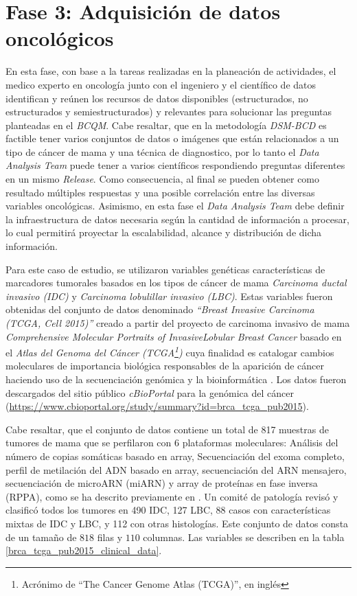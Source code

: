 \section{Fase 3: Adquisición de datos oncológicos}
En esta fase, con base a la tareas realizadas en la planeación de actividades, el medico experto en oncología junto con el ingeniero y el científico de datos identifican y reúnen los recursos de datos disponibles (estructurados, no estructurados y semiestructurados) y relevantes para solucionar las preguntas planteadas en el \textit{BCQM}. Cabe resaltar, que en la metodología \textit{\textit{DSM-BCD}} es factible tener varios conjuntos de datos o imágenes que están relacionados a un tipo de cáncer de mama y una técnica de diagnostico, por lo tanto  el \textit{Data Analysis Team} puede tener a varios científicos respondiendo preguntas diferentes en un mismo \textit{Release}. Como consecuencia, al final se pueden obtener como resultado múltiples respuestas y una posible correlación entre las diversas variables oncológicas.  Asimismo, en esta fase el \textit{Data Analysis Team} debe definir la infraestructura de datos necesaria según la cantidad de información a procesar, lo cual permitirá proyectar la escalabilidad, alcance y distribución de dicha información. 

Para este caso de estudio, se utilizaron variables genéticas características de marcadores tumorales  basados en los tipos de cáncer de mama  \textit{Carcinoma ductal invasivo (IDC)} y \textit{Carcinoma lobulillar invasivo (LBC)}. Estas variables fueron obtenidas del conjunto de datos denominado \textit{“Breast Invasive Carcinoma (TCGA, Cell 2015)”} creado a partir del proyecto de carcinoma invasivo de mama \textit{Comprehensive Molecular Portraits of InvasiveLobular Breast Cancer} \cite{Ciriello2015} basado en el \textit {Atlas del Genoma del Cáncer (TCGA\footnote{Acrónimo de “The Cancer Genome Atlas (TCGA)”, en inglés })} cuya finalidad es catalogar cambios moleculares de importancia biológica responsables de la aparición de cáncer haciendo uso de la secuenciación genómica y la bioinformática \cite{TCGA2023}. Los datos fueron descargados del sitio público \textit{cBioPortal} para la genómica del cáncer  (\url{https://www.cbioportal.org/study/summary?id=brca_tcga_pub2015}). 

Cabe resaltar, que el conjunto de datos contiene un total de 817 muestras de tumores de mama que  se perfilaron con 6 plataformas moleculares: Análisis del número de copias somáticas basado en array, Secuenciación del exoma completo, perfil de metilación del ADN basado en array, secuenciación del ARN mensajero, secuenciación de microARN (miARN) y array de proteínas en fase inversa (RPPA), como se ha descrito previamente en \cite{Bass2014}. Un comité de patología revisó y clasificó todos los tumores en 490 IDC, 127 LBC, 88 casos con características mixtas de IDC y LBC, y 112 con otras histologías. Este conjunto de datos consta de un tamaño de $818$ filas y $110$ columnas. Las variables se describen en la tabla \ref{brca_tcga_pub2015_clinical_data}. 

